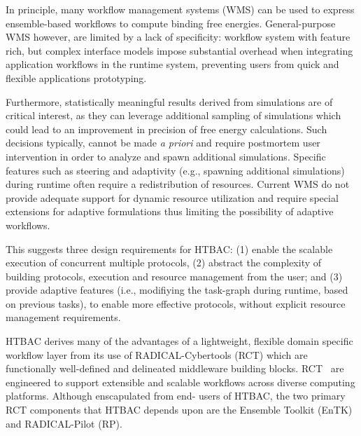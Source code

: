 In principle, many workflow management systems (WMS) can be used to express
ensemble-based workflows to compute binding free energies. General-purpose WMS
however, are limited by a lack of specificity: workflow system with feature
rich, but complex interface models impose substantial overhead when
integrating application workflows in the runtime system, preventing users from
quick and flexible applications prototyping.

Furthermore, statistically meaningful results derived from simulations are of
critical interest, as they can leverage additional sampling of simulations
which could lead to an improvement in precision of free energy calculations.
Such decisions typically, cannot be made {\it a priori} and require postmortem
user intervention in order to analyze and spawn additional simulations.
Specific features such as steering and adaptivity (e.g., spawning additional
simulations) during runtime often require a redistribution of resources.
Current WMS do not provide adequate support for dynamic resource utilization
and require special extensions for adaptive formulations thus limiting the
possibility of adaptive workflows.






This suggests three design requirements for HTBAC\@: (1) enable the scalable
execution of concurrent multiple protocols, (2) abstract the complexity of
building protocols, execution and resource management from the user; and (3)
provide adaptive features (i.e., modifiying the task-graph during runtime,
based on previous tasks), to enable more effective protocols, without explicit
resource management requirements.

HTBAC derives many of the advantages of a lightweight, flexible domain
specific workflow layer from its use of RADICAL-Cybertools (RCT) which are
functionally well-defined and delineated middleware building blocks.
RCT~\cite{review_bb_2016} are engineered to support extensible and scalable
workflows across diverse computing platforms. Although enscapulated from end-
users of HTBAC, the two primary RCT components that HTBAC depends upon are the
Ensemble Toolkit (EnTK) and RADICAL-Pilot (RP).


